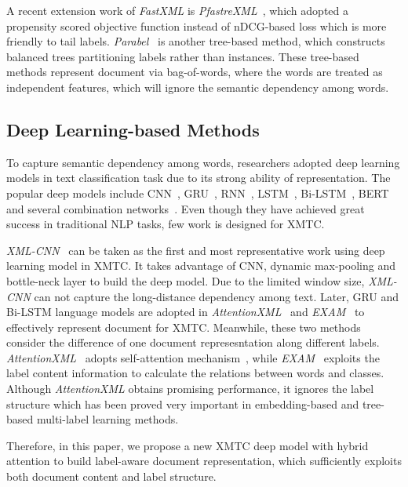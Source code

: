 \documentclass[runningheads]{llncs}
\begin{document}
A recent extension work of \textit{FastXML} is \textit{PfastreXML}~\cite{ref_article10}, which adopted a propensity scored objective function instead of nDCG-based loss which is more friendly to tail labels.  \textit{Parabel}~\cite{ref_article11} is another tree-based method, which constructs balanced trees partitioning labels rather than instances. These tree-based methods represent document via bag-of-words,  where the words are treated as independent features, which will ignore the semantic dependency among words.
\vspace{-2mm}
\subsection{Deep Learning-based Methods}
To capture semantic dependency among words, researchers adopted deep learning models in text classification task due to its strong ability of representation. 
The popular deep models include CNN~\cite{ref_article27}, GRU~\cite{ref_article26}, RNN~\cite{ref_article13}, LSTM~\cite{ref_article14}, Bi-LSTM~\cite{ref_article28}, BERT~\cite{ref_article30} and several combination networks~\cite{ref_article24,ref_article29}. Even though they have achieved great success in traditional NLP tasks, few work is designed for XMTC.

\textit{XML-CNN}~\cite{ref_article6} can be taken as the first and most representative work using deep learning model in XMTC. It takes advantage of CNN, dynamic max-pooling and bottle-neck layer to build the deep model. Due to the limited window size, \textit{XML-CNN} can not capture the long-distance dependency among text. Later, GRU and Bi-LSTM language models are adopted in \textit{AttentionXML}~\cite{ref_article7} and \textit{EXAM}~\cite{ref_article8} to effectively represent document for XMTC. Meanwhile, these two methods consider the difference of one document represesntation along different labels. \textit{AttentionXML}~\cite{ref_article7} adopts self-attention mechanism~\cite{ref_article16}, while \textit{EXAM}~\cite{ref_article8} exploits the label content information to calculate the relations between words and classes.
Although \textit{AttentionXML} obtains promising performance, it ignores the label structure which has been proved very important in embedding-based and tree-based multi-label learning methods. 

Therefore, in this paper, we propose a new XMTC deep model with hybrid attention to build label-aware document representation, which sufficiently exploits both document content and label structure.
\end{document}

